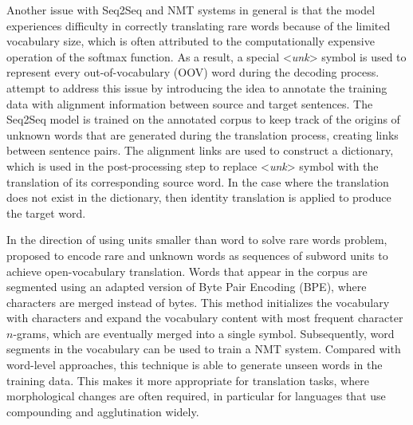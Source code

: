 \documentclass[12pt]{extarticle}
\begin{document}
Another issue with Seq2Seq and NMT systems in general is that the model experiences difficulty in correctly translating rare words because of the limited vocabulary size, which is often attributed to the computationally expensive operation of the softmax function. As a result, a special  \textless \textit{unk}\textgreater{} symbol is used to represent every out-of-vocabulary (OOV) word during the decoding process. \citep{luong-etal-2015-addressing} attempt to address this issue by introducing the idea to annotate the training data with alignment information between source and target sentences. The Seq2Seq model is trained on the annotated corpus to keep track of the origins of unknown words that are generated during the translation process, creating links between sentence pairs. The alignment links are used to construct a dictionary, which is used in the post-processing step to replace \textless \textit{unk}\textgreater{} symbol with the translation of its corresponding source word. In the case where the translation does not exist in the dictionary, then identity translation is applied to produce the target word.

In the direction of using units smaller than word to solve rare words problem, \citep{sennrich-etal-2016-neural} proposed to encode rare and unknown words as sequences of subword units to achieve open-vocabulary translation. Words that appear in the corpus are segmented using an adapted version of Byte Pair Encoding (BPE), where characters are merged instead of bytes. This method initializes the vocabulary with characters and expand the vocabulary content with most frequent character $n$-grams, which are eventually merged into a single symbol. Subsequently, word segments in the vocabulary can be used to train a NMT system. Compared with word-level approaches, this technique is able to generate unseen words in the training data. This makes it more appropriate for translation tasks, where morphological changes are often required, in particular for languages that use compounding and agglutination widely.
\end{document}
